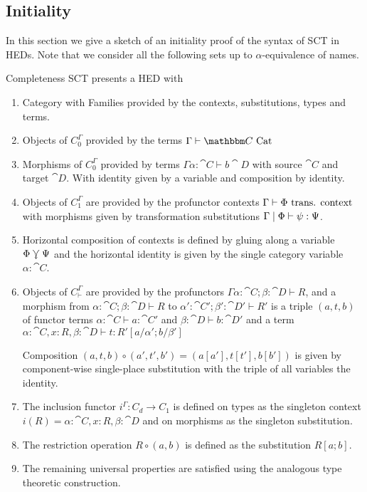 \documentclass{llncs}
\begin{document}
\subsection{Initiality}

In this section we give a sketch of an initiality proof of the syntax
of SCT in HEDs. Note that we consider all the following sets up to
$\alpha$-equivalence of names.

\begin{construction}{Completeness}
  SCT presents a HED with
  \begin{enumerate}
  \item Category with Families provided by the contexts,
    substitutions, types and terms.
  \item Objects of $C_0^\Gamma$ provided by the terms $\Gamma \vdash \cat C \isaCat$
  \item Morphisms of $C_0^\Gamma$ provided by terms $\Gamma
    \alpha:\cat C \vdash b \cat D$ with source $\cat C$ and target
    $\cat D$. With identity given by a variable and composition by identity.
  \item Objects of $C_1^\Gamma$ are provided by the profunctor
    contexts $\Gamma \vdash \Phi \,\,\textrm{trans. context}$ with morphisms given by
    transformation substitutions $\Gamma \mathrel{|} \Phi \vdash \psi :
    \Psi$.
  \item Horizontal composition of contexts is defined by gluing along
    a variable $\Phi\curlyveedownarrow \Psi$ and the horizontal identity is given
    by the single category variable $\alpha:\cat C$.
  \item Objects of $C_\vdash^\Gamma$ are provided by the profunctors
    $\Gamma\alpha:\cat C;\beta:\cat D \vdash R$, and a morphism from
    $\alpha:\cat C;\beta:\cat D \vdash R$ to $\alpha':\cat
    C';\beta':\cat D' \vdash R'$ is a triple $(a,t,b)$ of functor
    terms $\alpha:\cat C \vdash a : \cat C'$ and $\beta:\cat D\vdash b
    : \cat D'$ and a term $\alpha:\cat C,x:R,\beta:\cat D \vdash t :
    R'[a/\alpha';b/\beta']$

    Composition $(a,t,b) \circ (a',t',b') = (a[a'],t[t'],b[b'])$ is
    given by component-wise single-place substitution with the triple
    of all variables the identity.
  \item The inclusion functor $i^\Gamma : C_d \to C_1$ is defined on
    types as the singleton context $i(R) = \alpha:\cat
    C,x:R,\beta:\cat D$ and on morphisms as the singleton
    substitution.
  \item The restriction operation $R \circ (a,b)$ is defined as the
    substitution $R[a;b]$.
  \item The remaining universal properties are satisfied using the
    analogous type theoretic construction.
  \end{enumerate}
\end{construction}
\end{document}

